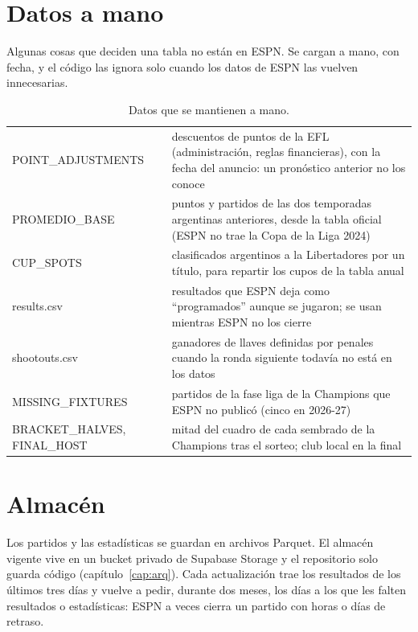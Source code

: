 \section{Datos a mano}

Algunas cosas que deciden una tabla no están en ESPN. Se cargan a mano, con fecha, y el código las ignora solo cuando los datos de ESPN las vuelven innecesarias.

\begin{table}[h]
\centering
\caption{Datos que se mantienen a mano.}
\label{tab:manual}
\small
\begin{tabularx}{\textwidth}{@{}>{\ttfamily\small}p{4.4cm}L@{}}
\toprule
{} &  \\
\midrule
POINT\_ADJUSTMENTS & descuentos de puntos de la EFL (administración, reglas financieras), con la fecha del anuncio: un pronóstico anterior no los conoce \\
PROMEDIO\_BASE & puntos y partidos de las dos temporadas argentinas anteriores, desde la tabla oficial (ESPN no trae la Copa de la Liga 2024) \\
CUP\_SPOTS & clasificados argentinos a la Libertadores por un título, para repartir los cupos de la tabla anual \\
results.csv & resultados que ESPN deja como ``programados'' aunque se jugaron; se usan mientras ESPN no los cierre \\
shootouts.csv & ganadores de llaves definidas por penales cuando la ronda siguiente todavía no está en los datos \\
MISSING\_FIXTURES & partidos de la fase liga de la Champions que ESPN no publicó (cinco en 2026-27) \\
BRACKET\_HALVES, FINAL\_HOST & mitad del cuadro de cada sembrado de la Champions tras el sorteo; club local en la final \\
\bottomrule
\end{tabularx}
\end{table}

\section{Almacén}

Los partidos y las estadísticas se guardan en archivos Parquet. El almacén vigente vive en un bucket privado de Supabase Storage y el repositorio solo guarda código (capítulo~\ref{cap:arq}). Cada actualización trae los resultados de los últimos tres días y vuelve a pedir, durante dos meses, los días a los que les falten resultados o estadísticas: ESPN a veces cierra un partido con horas o días de retraso.
